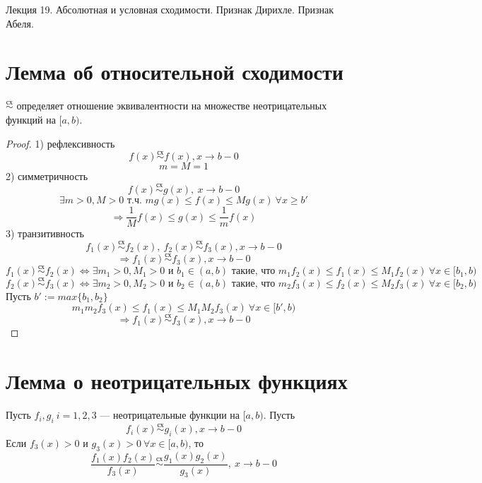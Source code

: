 \documentclass[11pt]{article}
\begin{document}
\begin{titlepage}
    \centering
    \vspace*{\fill}  %

    {\Huge Лекция 19. Абсолютная и условная сходимости. Признак Дирихле. Признак Абеля.
    \par}

    \vspace*{\fill}  %
\end{titlepage}

\setcounter{page}{1}

\section{Лемма об относительной сходимости}
\begin{lemma}
    $\overset{\text{сх}}{\sim}$ определяет отношение эквивалентности на множестве неотрицательных функций на $[a,b)$.
\end{lemma}

\begin{proof}
    1) рефлексивность
    \[ f(x) \overset{\text{сх}}{\sim} f(x), x\to b-0 \]
    \[ m=M=1 \]
    2) симметричность
    \[ f(x) \overset{\text{сх}}{\sim} g(x), \ x\to b-0 \]
    \[\exists m>0, M>0 \text{ т.ч. } mg(x)\le f(x) \le Mg(x) \ \forall x\ge b' \]
    \[ \Rightarrow \frac{1}{M} f(x) \le g(x) \le \frac{1}{m} f(x) \]
    3) транзитивность
    \[ f_1(x) \overset{\text{сх}}{\sim} f_2(x), \ f_2(x) \overset{\text{сх}}{\sim} f_3(x) , x\to b-0 \]
    \[ \Rightarrow f_1(x) \overset{\text{сх}}{\sim} f_3(x), x\to b-0 \]
    \[ f_1(x) \overset{\text{сх}}{\sim} f_2(x) \Leftrightarrow \exists m_1>0,M_1>0 \text{ и } b_1\in (a,b)  \text{ такие, что } m_1f_2(x) \le f_1(x) \le M_1f_2(x) \ \forall x\in [b_1,b) \]
    \[ f_2(x) \overset{\text{сх}}{\sim} f_3(x) \Leftrightarrow \exists m_2>0,M_2>0 \text{ и } b_2\in (a,b)  \text{ такие, что } m_2f_3(x) \le f_2(x) \le M_2f_3(x) \ \forall x\in [b_2,b) \]
    Пусть $b':= max \{b_1,b_2\}$
    \[ m_1m_2f_3(x)\le f_1(x) \le M_1M_2f_3(x) \ \forall x\in [b',b) \]
    \[ \Rightarrow f_1(x)\overset{\text{сх}}{\sim} f_3(x), x\to b-0 \]
\end{proof}

\section{Лемма о неотрицательных функциях}

\begin{lemma}
    Пусть $f_i, g_i \ i=1,2,3$ --- неотрицательные функции на $[a,b)$. Пусть 
    \[ f_i(x) \overset{\text{сх}}{\sim} g_i(x), x\to b-0 \]
    Если $f_3(x)>0$ и $g_3(x)>0 \ \forall x\in [a,b)$, то 
    \[ \frac{f_1(x)f_2(x)}{f_3(x)} \overset{\text{сх}}{\sim} \frac{g_1(x)g_2(x)}{g_3(x)}, \  x\to b-0 \]
\end{lemma}
\end{document}
